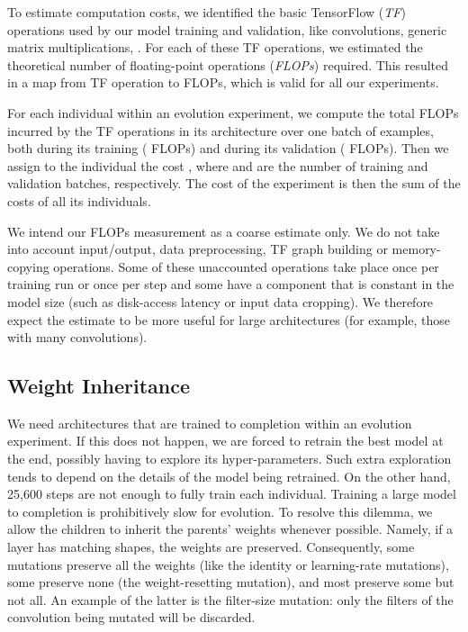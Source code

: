 \documentclass{article}
\begin{document}
To estimate computation costs, we identified the basic TensorFlow ({\em TF}) operations used by our model training and validation, like convolutions, generic matrix multiplications, \etc. For each of these TF operations, we estimated the theoretical number of floating-point operations ({\em FLOPs}) required. This resulted in a map from TF operation to FLOPs, which is valid for all our experiments.

For each individual within an evolution experiment, we compute the total FLOPs incurred by the TF operations in its architecture over one batch of examples, both during its training ( FLOPs) and during its validation ( FLOPs). Then we assign to the individual the cost , where  and  are the number of training and validation batches, respectively. The cost of the experiment is then the sum of the costs of all its individuals.

We intend our FLOPs measurement as a coarse estimate only. We do not take into account input/output, data preprocessing, TF graph building or memory-copying operations. Some of these unaccounted operations take place once per training run or once per step and some have a component that is constant in the model size (such as disk-access latency or input data cropping). We therefore expect the estimate to be more useful for large architectures (for example, those with many convolutions).


\subsection{Weight Inheritance}
\label{weight_inheritance_section}

We need architectures that are trained to completion within an evolution experiment. If this does not happen, we are forced to retrain the best model at the end, possibly having to explore its hyper-parameters. Such extra exploration tends to depend on the details of the model being retrained. On the other hand, 25,600 steps are not enough to fully train each individual. Training a large model to completion is prohibitively slow for evolution. To resolve this dilemma, we allow the children to inherit the parents' weights whenever possible. Namely, if a layer has matching shapes, the weights are preserved. Consequently, some mutations preserve all the weights (like the identity or learning-rate mutations), some preserve none (the weight-resetting mutation), and most preserve some but not all. An example of the latter is the filter-size mutation: only the filters of the convolution being mutated will be discarded.
\end{document}
